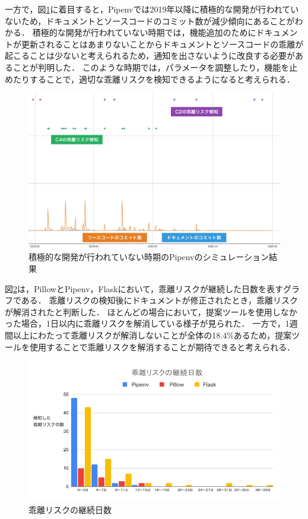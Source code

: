 一方で，図\ref{simpipenv}に着目すると，Pipenvでは2019年以降に積極的な開発が行われていないため，ドキュメントとソースコードのコミット数が減少傾向にあることがわかる．
積極的な開発が行われていない時期では，機能追加のためにドキュメントが更新されることはあまりないことからドキュメントとソースコードの乖離が起こることは少ないと考えられるため，通知を出さないように改良する必要があることが判明した．
このような時期では，パラメータを調整したり，機能を止めたりすることで，適切な乖離リスクを検知できるようになると考えられる．
\begin{figure}[H]
    \centering
    \includegraphics[width=12cm]{images/pipenv.png}
    \caption{積極的な開発が行われていない時期のPipenvのシミュレーション結果}
    \label{simpipenv}
\end{figure}

図\ref{time}は，PillowとPipenv，Flaskにおいて，乖離リスクが継続した日数を表すグラフである．
乖離リスクの検知後にドキュメントが修正されたとき，乖離リスクが解消されたと判断した．
ほとんどの場合において，提案ツールを使用しなかった場合，1日以内に乖離リスクを解消している様子が見られた．
一方で，1週間以上にわたって乖離リスクが解消しないことが全体の18.4\%あるため，提案ツールを使用することで乖離リスクを解消することが期待できると考えられる．
\begin{figure}[H]
    \centering
    \includegraphics[width=12cm]{images/time.png}
    \caption{乖離リスクの継続日数}
    \label{time}
\end{figure}

